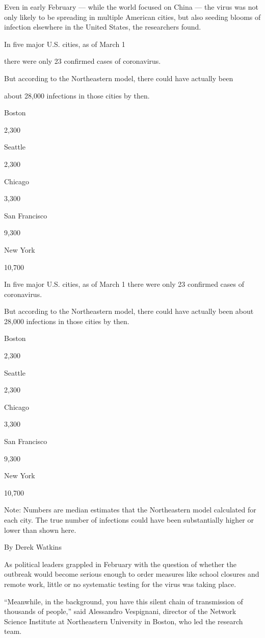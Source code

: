Even in early February --- while the world focused on China --- the
virus was not only likely to be spreading in multiple American cities,
but also seeding blooms of infection elsewhere in the United States, the
researchers found.

In five major U.S. cities, as of March 1

there were only 23 confirmed cases of coronavirus.

But according to the Northeastern model, there could have actually been

about 28,000 infections in those cities by then.

Boston

2,300

Seattle

2,300

Chicago

3,300

San Francisco

9,300

New York

10,700

In five major U.S. cities, as of March 1 there were only 23 confirmed
cases of coronavirus.

But according to the Northeastern model, there could have actually been
about 28,000 infections in those cities by then.

Boston

2,300

Seattle

2,300

Chicago

3,300

San Francisco

9,300

New York

10,700

Note: Numbers are median estimates that the Northeastern model
calculated for each city. The true number of infections could have been
substantially higher or lower than shown here.

By Derek Watkins

As political leaders grappled in February with the question of whether
the outbreak would become serious enough to order measures like school
closures and remote work, little or no systematic testing for the virus
was taking place.

``Meanwhile, in the background, you have this silent chain of
transmission of thousands of people,'' said Alessandro Vespignani,
director of the Network Science Institute at Northeastern University in
Boston, who led the research team.

